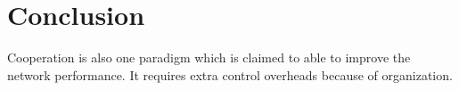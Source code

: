 \chapter{Conclusion}
Cooperation is also one paradigm which is claimed to able to improve the network performance.
It requires extra control overheads because of organization.